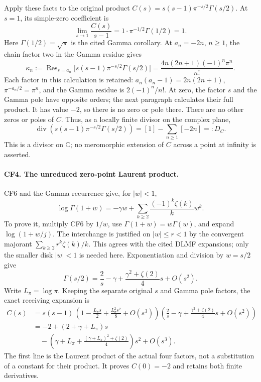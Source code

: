 Apply these facts to the original product
\(C(s)=s(s-1)\pi^{-s/2}\Gamma(s/2)\).
At \(s=1\), its simple-zero coefficient is
\[
 \lim_{s\to1}\frac{C(s)}{s-1}
 =1\cdot\pi^{-1/2}\Gamma(1/2)=1.
 \tag{CF8}
\]
Here \(\Gamma(1/2)=\sqrt\pi\) is the cited Gamma corollary.
At \(a_n=-2n\), \(n\ge1\), the chain factor two in the
Gamma residue gives
\[
 \kappa_n:=\operatorname{Res}_{s=a_n}
  \bigl[s(s-1)\pi^{-s/2}\Gamma(s/2)\bigr]
  =\frac{4n(2n+1)(-1)^n\pi^n}{n!}.
 \tag{CF9}
\]
Each factor in this calculation is retained:
\(a_n(a_n-1)=2n(2n+1)\),
\(\pi^{-a_n/2}=\pi^n\), and the Gamma residue is
\(2(-1)^n/n!\).
At zero, the factor \(s\) and the Gamma pole have opposite
orders; the next paragraph calculates their full product.
It has value \(-2\), so there is no zero or pole there.
There are no other zeros or poles of \(C\). Thus, as a
locally finite divisor on the complex plane,
\[
 \operatorname{div}\!\left(s(s-1)\pi^{-s/2}\Gamma(s/2)\right)
 =[1]-\sum_{n\ge1}[-2n]=:D_C .
 \tag{CF10}
\]
This is a divisor on \(\mathbb C\); no meromorphic extension
of \(C\) across a point at infinity is asserted.

\paragraph{CF4. The unreduced zero-point Laurent product.}
CF6 and the Gamma recurrence give, for \(|w|<1\),
\[
 \log\Gamma(1+w)
 =-\gamma w+\sum_{k\ge2}\frac{(-1)^k\zeta(k)}{k}w^k .
 \tag{CF11}
\]
To prove it, multiply CF6 by \(1/w\), use
\(\Gamma(1+w)=w\Gamma(w)\), and expand
\(\log(1+w/j)\). The interchange is justified on
\(|w|\le r<1\) by the convergent majorant
\(\sum_{k\ge2}r^k\zeta(k)/k\).
This agrees with the cited DLMF expansions; only the
smaller disk \(|w|<1\) is needed here.
Exponentiation and division by \(w=s/2\) give
\[
 \Gamma(s/2)=\frac2s-\gamma+
             \frac{\gamma^2+\zeta(2)}4s+O(s^2).
\]
Write \(L_\pi=\log\pi\). Keeping the separate original
\(s\) and Gamma pole factors, the exact receiving expansion is
\[
 \begin{split}
 C(s)
 &=s(s-1)\,
   \left(1-\frac{L_\pi s}{2}+\frac{L_\pi^2s^2}{8}
         +O(s^3)\right)
   \left(\frac2s-\gamma+
             \frac{\gamma^2+\zeta(2)}4s+O(s^2)\right)\\
 &=-2+(2+\gamma+L_\pi)s\\
 &\quad-\left(\gamma+L_\pi+
       \frac{(\gamma+L_\pi)^2+\zeta(2)}4\right)s^2
       +O(s^3).
 \end{split}\tag{CF12}
\]
The first line is the Laurent product of the actual four
factors, not a substitution of a constant for their product.
It proves \(C(0)=-2\) and retains both finite derivatives.

